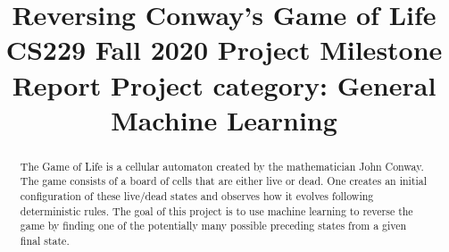 \documentclass[conference]{IEEEtran}
\begin{document}
\title{Reversing Conway's Game of Life\\
{\footnotesize CS229 Fall 2020 Project Milestone Report \hspace{2cm}
Project category: General Machine Learning}
}

\author{
\and
{}
\and
{}
}

\maketitle

\begin{abstract}
The Game of Life is a cellular automaton created by the mathematician John Conway. The game consists of a board of cells that are either live or dead. One creates an initial configuration of these live/dead states and observes how it evolves \cite{b1} \cite{b2} following deterministic rules. The goal of this project is to use machine learning to reverse the game by finding one of the potentially many possible preceding states from a given final state.
\end{abstract}

\begin{comment}
\begin{IEEEkeywords}
convolutional neural networks, Kaggle competition, game, simulators
\end{IEEEkeywords}
\end{comment}
\end{document}
